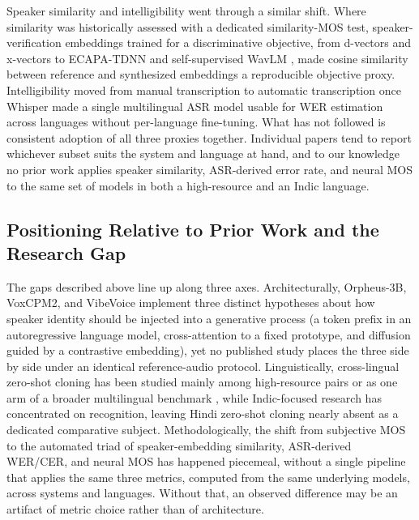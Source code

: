 \documentclass[conference]{IEEEtran}
\begin{document}
Speaker similarity and intelligibility went through a similar shift. Where
similarity was historically assessed with a dedicated similarity-MOS test,
speaker-verification embeddings trained for a discriminative objective, from
d-vectors \cite{variani2014deep} and x-vectors \cite{snyder2018xvectors} to
ECAPA-TDNN \cite{desplanques2020ecapa} and self-supervised WavLM
\cite{chen2022wavlm}, made cosine similarity between reference and
synthesized embeddings a reproducible objective proxy. Intelligibility moved
from manual transcription to automatic transcription once Whisper
\cite{radford2023whisper} made a single multilingual ASR model usable for WER
estimation across languages without per-language fine-tuning. What has not
followed is consistent adoption of all three proxies together. Individual
papers tend to report whichever subset suits the system and language at hand,
and to our knowledge no prior work applies speaker similarity, ASR-derived
error rate, and neural MOS to the same set of models in both a high-resource
and an Indic language.

\subsection{Positioning Relative to Prior Work and the Research Gap}
\label{sec:related-gap}

The gaps described above line up along three axes. Architecturally,
Orpheus-3B, VoxCPM2, and VibeVoice implement three distinct hypotheses about
how speaker identity should be injected into a generative process (a token
prefix in an autoregressive language model, cross-attention to a fixed
prototype, and diffusion guided by a contrastive embedding), yet no published
study places the three side by side under an identical reference-audio
protocol. Linguistically, cross-lingual zero-shot cloning has been studied
mainly among high-resource pairs \cite{zhang2023speak} or as one arm of a
broader multilingual benchmark \cite{casanova2024xtts}, while Indic-focused
research \cite{javed2022towards, bhogale2023vistaar, javed2024indicvoices}
has concentrated on recognition, leaving Hindi zero-shot cloning nearly
absent as a dedicated comparative subject. Methodologically, the shift from
subjective MOS to the automated triad of speaker-embedding similarity,
ASR-derived WER/CER, and neural MOS has happened piecemeal, without a single
pipeline that applies the same three metrics, computed from the same
underlying models, across systems and languages. Without that, an observed
difference may be an artifact of metric choice rather than of architecture.
\end{document}
